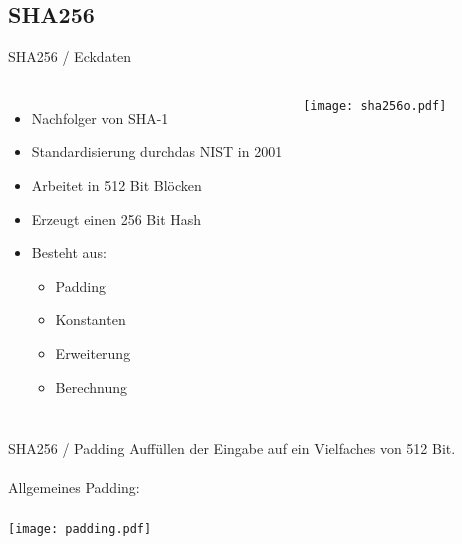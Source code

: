 \documentclass{beamer}
\begin{document}
\subsection{SHA256}
    \begin{frame}{SHA256 / Eckdaten}
      \begin{columns}[T]
        \begin{itemize}
          \item Nachfolger von SHA-1\\
          \item Standardisierung durch\newline das NIST in 2001\\
          \item Arbeitet in 512 Bit Blöcken\\
          \item Erzeugt einen 256 Bit Hash\\
          \item Besteht aus:\\
          \begin{itemize}
            \item Padding\\
            \item Konstanten\\
            \item Erweiterung\\
            \item Berechnung
          \end{itemize}
        \end{itemize}
        \texttt{[image: sha256o.pdf]}
      \end{columns} 
    \end{frame}
    \begin{frame}{SHA256 / Padding}
      Auffüllen der Eingabe auf ein Vielfaches von 512 Bit.\\
      ~\\
      Allgemeines Padding:\\
      ~\\
      \texttt{[image: padding.pdf]}\\
    \end{frame}
\end{document}
